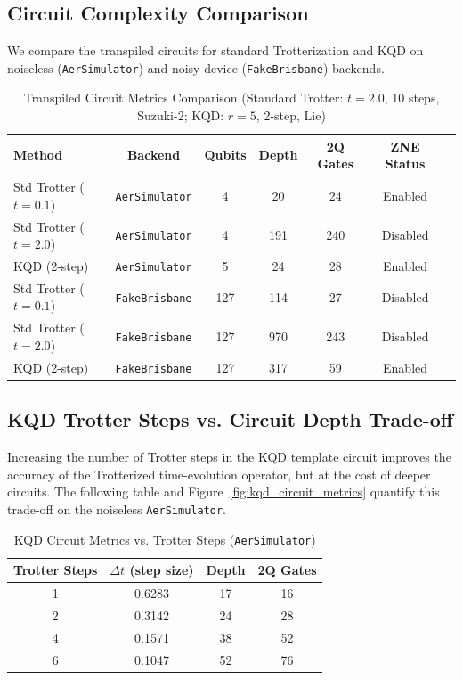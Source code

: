 \documentclass[11pt,a4paper]{article}
\begin{document}
\subsection{Circuit Complexity Comparison}
We compare the transpiled circuits for standard Trotterization and KQD on noiseless (\texttt{AerSimulator}) and noisy device (\texttt{FakeBrisbane}) backends.

\begin{table}[H]
\centering
\caption{Transpiled Circuit Metrics Comparison (Standard Trotter: $t=2.0$, 10 steps, Suzuki-2; KQD: $r=5$, 2-step, Lie)}
\begin{tabular}{lcccccc}
\toprule
Method & Backend & Qubits & Depth & 2Q Gates & ZNE Status \\
\midrule
Std Trotter ($t=0.1$) & \texttt{AerSimulator} & 4 & 20 & 24 & Enabled \\
Std Trotter ($t=2.0$) & \texttt{AerSimulator} & 4 & 191 & 240 & Disabled \\
KQD (2-step) & \texttt{AerSimulator} & 5 & 24 & 28 & Enabled \\
\midrule
Std Trotter ($t=0.1$) & \texttt{FakeBrisbane} & 127 & 114 & 27 & Disabled \\
Std Trotter ($t=2.0$) & \texttt{FakeBrisbane} & 127 & 970 & 243 & Disabled \\
KQD (2-step) & \texttt{FakeBrisbane} & 127 & 317 & 59 & Enabled \\
\bottomrule
\end{tabular}
\end{table}

\subsection{KQD Trotter Steps vs. Circuit Depth Trade-off}
Increasing the number of Trotter steps in the KQD template circuit improves the accuracy of the Trotterized time-evolution operator, but at the cost of deeper circuits. The following table and Figure~\ref{fig:kqd_circuit_metrics} quantify this trade-off on the noiseless \texttt{AerSimulator}.

\begin{table}[H]
\centering
\caption{KQD Circuit Metrics vs. Trotter Steps (\texttt{AerSimulator})}
\begin{tabular}{cccc}
\toprule
Trotter Steps & $\Delta t$ (step size) & Depth & 2Q Gates \\
\midrule
1 & 0.6283 & 17 & 16 \\
2 & 0.3142 & 24 & 28 \\
4 & 0.1571 & 38 & 52 \\
6 & 0.1047 & 52 & 76 \\
\bottomrule
\end{tabular}
\end{table}
\end{document}
